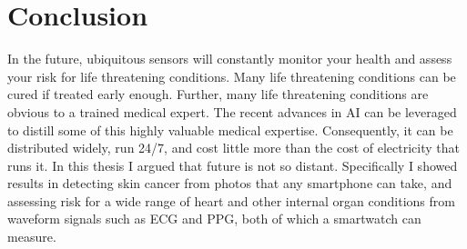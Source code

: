 \chapter{Conclusion}
In the future, ubiquitous sensors will constantly monitor your health and assess your risk for life threatening conditions.  Many life threatening conditions can be cured if treated early enough.  Further, many life threatening conditions are obvious to a trained medical expert.  The recent advances in AI can be leveraged to distill some of this highly valuable medical expertise.  Consequently, it can be distributed widely, run 24/7, and cost little more than the cost of electricity that runs it.  In this thesis I argued that future is not so distant.  Specifically I showed results in detecting skin cancer from photos that any smartphone can take, and assessing risk for a wide range of heart and other internal organ conditions from waveform signals such as ECG and PPG, both of which a smartwatch can measure.